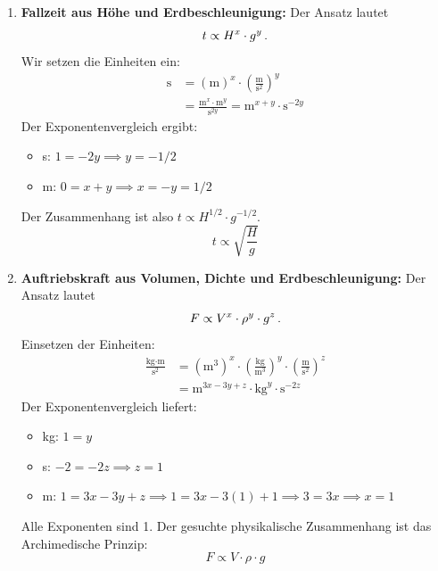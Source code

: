 \documentclass[ngerman]{scrreprt}
\newenvironment{loesungbox}[1]
  {\needspace{5\baselineskip}\begin{loesungboxstyle}[frametitle={#1}]}
  {\end{loesungboxstyle}}
\begin{document}
\begin{loesungbox}{Lösung zu \Cref{aufg:dimensionsanalyse}}
\begin{enumerate}
    \item \textbf{Fallzeit aus Höhe und Erdbeschleunigung:}
    Der Ansatz lautet 
    \begin{equation}
        t \propto H^x \cdot g^y \,.
    \end{equation}
    Wir setzen die Einheiten ein:
    \begin{equation}\begin{aligned}
        \si{\second} &= {(\si{\meter})}^x \cdot {\left(\frac{\si{\meter}}{\si{\second\squared}}\right)}^y \\
        &= \frac{\si{\meter}^x \cdot \si{\meter}^y}{\si{\second}^{2y}} = \si{\meter}^{x+y} \cdot \si{\second}^{-2y}
    \end{aligned}\end{equation}
    Der Exponentenvergleich ergibt:
    \begin{itemize}
        \item \si{\second}: $1 = -2y \implies y = -1/2$
        \item \si{\meter}: $0 = x+y \implies x = -y = 1/2$
    \end{itemize}
    Der Zusammenhang ist also $t \propto H^{1/2} \cdot g^{-1/2}$.
    \begin{equation}\label{eq: fallzeit_h_g}
        t \propto \sqrt{\frac{H}{g}}
    \end{equation}
    
    \item \textbf{Auftriebskraft aus Volumen, Dichte und Erdbeschleunigung:}
    Der Ansatz lautet 
    \begin{equation}
        F \propto V^x \cdot \rho^y \cdot g^z \,.
    \end{equation}
    Einsetzen der Einheiten:
    \begin{equation}\begin{aligned}
        \frac{\si{\kilo\gram\cdot\meter}}{\si{\second\squared}} &= {(\si{\meter\cubed})}^x \cdot {\left(\frac{\si{\kilo\gram}}{\si{\meter\cubed}}\right)}^y \cdot {\left(\frac{\si{\meter}}{\si{\second\squared}}\right)}^z \\
        &= \si{\meter}^{3x-3y+z} \cdot \si{\kilo\gram}^y \cdot \si{\second}^{-2z}
    \end{aligned}\end{equation}
    Der Exponentenvergleich liefert:
    \begin{itemize}
        \item \si{\kilo\gram}: $1 = y$
        \item \si{\second}: $-2 = -2z \implies z=1$
        \item \si{\meter}: $1 = 3x - 3y + z \implies 1 = 3x - 3(1) + 1 \implies 3 = 3x \implies x=1$
    \end{itemize}
    Alle Exponenten sind 1. Der gesuchte physikalische Zusammenhang ist das Archimedische Prinzip:
    \begin{equation}\label{eq: auftrieb}
        F \propto V \cdot \rho \cdot g
    \end{equation}
\end{enumerate}
\end{loesungbox}
\end{document}
